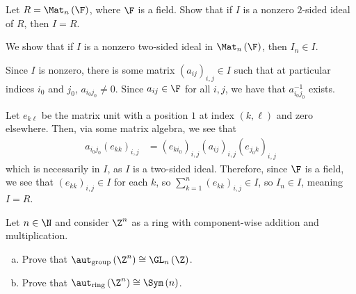 \documentclass[10pt]{mypackage}
\begin{document}
\begin{problem}[Problem 7]
  Let $R = \Mat_{n}\left( \F \right)$, where $\F$ is a field. Show that if $I$ is a nonzero $2$-sided ideal of $R$, then $I = R$.
\end{problem}
\begin{solution}
  We show that if $I$ is a nonzero two-sided ideal in $\Mat_{n}\left( \F \right)$, then $I_{n}\in I$.\newline

  Since $I$ is nonzero, there is some matrix $\left( a_{ij} \right)_{i,j}\in I$ such that at particular indices $i_0$ and $j_0$, $a_{i_0j_0}\neq 0$. Since $a_{ij}\in \F$ for all $i,j$, we have that $a_{i_0j_0}^{-1}$ exists.\newline

  Let $e_{k\ell}$ be the matrix unit with a position $1$ at index $\left( k,\ell \right)$ and zero elsewhere. Then, via some matrix algebra, we see that
  \begin{align*}
    a_{i_0j_0} \left( e_{kk} \right)_{i,j} &= \left( e_{ki_0} \right)_{i,j}\left( a_{ij} \right)_{i,j} \left( e_{j_0 k} \right)_{i,j}
  \end{align*}
  which is necessarily in $I$, as $I$ is a two-sided ideal. Therefore, since $\F$ is a field, we see that $\left( e_{kk} \right)_{i,j}\in I$ for each $k$, so $\sum_{k=1}^{n}\left( e_{kk} \right)_{i,j}\in I$, so $I_{n}\in I$, meaning $I = R$.
\end{solution}
\begin{problem}[Problem 8]
  Let $n\in\N$ and consider $\Z^{n}$ as a ring with component-wise addition and multiplication.
  \begin{enumerate}[(a)]
    \item Prove that $\aut_{\text{group}}\left( \Z^{n} \right) \cong \GL_{n}\left( \Z \right)$.
    \item Prove that $\aut_{\text{ring}} \left( \Z^{n} \right) \cong \Sym\left( n \right)$.
  \end{enumerate}
\end{problem}
\end{document}
